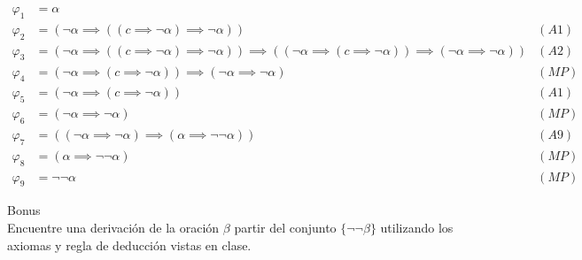 \begin{sol}
    \begin{align*}
        \varphi_1 & = \alpha                                                                                                                                                                           \\
        \varphi_2 & = (\neg \alpha \implies ((c \implies \neg \alpha )\implies \neg \alpha))                                                                                                    & (A1) \\
        \varphi_3 & = (\neg \alpha \implies ((c \implies \neg \alpha)\implies \neg \alpha))\implies ((\neg \alpha \implies (c \implies \neg \alpha))\implies(\neg \alpha \implies \neg \alpha)) & (A2) \\
        \varphi_4 & = (\neg \alpha \implies (c \implies \neg \alpha))\implies (\neg \alpha \implies \neg \alpha)                                                                                & (MP) \\
        \varphi_5 & = (\neg \alpha \implies (c \implies \neg \alpha))                                                                                                                           & (A1) \\
        \varphi_6 & = (\neg \alpha \implies \neg \alpha)                                                                                                                                        & (MP) \\
        \varphi_7 & = ((\neg \alpha \implies \neg \alpha) \implies (\alpha \implies \neg \neg \alpha))                                                                                            & (A9) \\
        \varphi_8 & = (\alpha \implies \neg \neg \alpha)                                                                                                                                        & (MP) \\
        \varphi_9 & = \neg \neg \alpha                                                                                                                                                          & (MP)
    \end{align*}
\end{sol}

\begin{prob}
    Bonus
    \\
    Encuentre una derivación de la oración $\beta$  partir del conjunto $\{\neg \neg \beta\}$ utilizando los axiomas y regla de deducción vistas en clase.
\end{prob}

